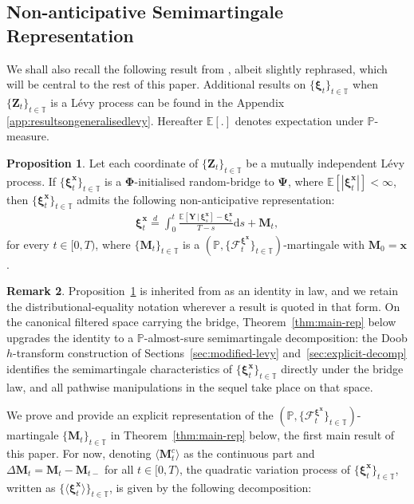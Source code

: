 \documentclass{article}
\newcommand{\levy}{{L\'evy }}
\def\P{\mathbb{P}}
\def\E{\mathbb{E}}
\def\T{\mathbb{T}}
\def\dd{\mathrm{d}}
\def\F{\mathcal{F}}
\def\xib{\boldsymbol{\xi}}
\theoremstyle{definition}
\newtheorem{proposition}{Proposition}[section]
\newtheorem{remark}[proposition]{Remark}
\begin{document}
\subsection{Non-anticipative Semimartingale Representation}\label{sec:semimartingale}
We shall also recall the following result from \cite{goria_random-bridges_2025}, albeit slightly rephrased, which will be central to the rest of this paper. Additional results on $\{\xib_t\}_{t\in\T}$ when $\{\mathbf{Z}_t\}_{t\in\T}$ is a \levy process can be found in the Appendix \ref{app:resultsongeneralisedlevy}. Hereafter $\E[.]$ denotes expectation under $\P$-measure.
\begin{proposition}
\label{stochfiltlevyrandom}
Let each coordinate of $\{\mathbf{Z}_t\}_{t\in\T}$ be a mutually independent \levy process. If $\{\xib^{\boldsymbol{x}}_t\}_{t\in\T}$ is a $\boldsymbol{\Phi}$-initialised random-bridge to $\boldsymbol{\Psi}$, where $\E[|\xib^{\boldsymbol{x}}_t|] < \infty$, then $\{\xib^{\boldsymbol{x}}_t\}_{t\in\T}$ admits the following non-anticipative representation:
\begin{align}
\label{nonanticipativereplevyrandombridge}
\xib^{\boldsymbol{x}}_t \overset{d}{=} \int_0^t \frac{  \E\left[ \boldsymbol{Y} \, | \, \xib^{\boldsymbol{x}}_s \right]  - \xib^{\boldsymbol{x}}_s }{T-s}\dd s + \mathbf{M}_t,
\end{align}
for every $t\in[0,T)$, where $\{\mathbf{M}_t\}_{t\in\T}$ is a $(\P,\{\F_{t}^{\xib^{\boldsymbol{x}}}\}_{t\in\T})$-martingale with $\mathbf{M}_{0} = \boldsymbol{x}$.
\end{proposition}
\begin{remark}
Proposition~\ref{stochfiltlevyrandom} is inherited from \cite{goria_random-bridges_2025} as an identity in law, and we retain the distributional-equality notation wherever a result is quoted in that form. On the canonical filtered space carrying the bridge, Theorem~\ref{thm:main-rep} below upgrades the identity to a $\P$-almost-sure semimartingale decomposition: the Doob $h$-transform construction of Sections~\ref{sec:modified-levy} and~\ref{sec:explicit-decomp} identifies the semimartingale characteristics of $\{\xib^{\boldsymbol{x}}_t\}_{t\in\T}$ directly under the bridge law, and all pathwise manipulations in the sequel take place on that space.
\end{remark}
We prove and provide an explicit representation of the $(\P,\{\F_{t}^{\xib^{\boldsymbol{x}}}\}_{t\in\T})$-martingale $\{\mathbf{M}_t\}_{t\in\T}$ in Theorem~\ref{thm:main-rep} below, the first main result of this paper. For now, denoting  $\langle \boldsymbol{M}_t^c \rangle$ as the continuous part and $\Delta \boldsymbol{M}_t = \boldsymbol{M}_t - \boldsymbol{M}_{t-}$ for all $t\in[0,T)$, the quadratic variation process of $\{\xib^{\boldsymbol{x}}_t\}_{t\in\T}$, written as $\{\langle\xib^{\boldsymbol{x}}_t\rangle\}_{t\in\T}$, is given by the following decomposition:
\end{document}

